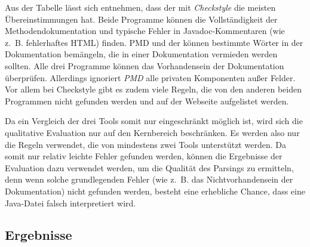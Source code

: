 Aus der Tabelle lässt sich entnehmen, dass der \doceval mit \textit{Checkstyle} die meisten Übereinstimmungen hat. Beide Programme können die Vollständigkeit der Methodendokumentation und typische Fehler in Javadoc-Kommentaren (wie z.~B. fehlerhaftes HTML) finden. PMD und der \doceval können bestimmte Wörter in der Dokumentation bemängeln, die in einer Dokumentation vermieden werden sollten. Alle drei Programme können das Vorhandensein der Dokumentation überprüfen. Allerdings ignoriert \textit{PMD} alle privaten Komponenten außer Felder. Vor allem bei Checkstyle gibt es zudem viele Regeln, die von den anderen beiden Programmen nicht gefunden werden und auf der Webseite \cite{checkstyle_doc_metrics} aufgelistet werden.

Da ein Vergleich der drei Tools somit nur eingeschränkt möglich ist, wird sich die qualitative Evaluation nur auf den Kernbereich beschränken. Es werden also nur die Regeln verwendet, die von mindestens zwei Tools unterstützt werden. Da somit nur relativ leichte Fehler gefunden werden, können die Ergebnisse der Evaluation dazu verwendet werden, um die Qualität des Parsings zu ermitteln, denn wenn solche grundlegenden Fehler (wie z.~B. das Nichtvorhandensein der Dokumentation) nicht gefunden werden, besteht eine erhebliche Chance, dass eine Java-Datei falsch interpretiert wird. 



\subsection{Ergebnisse}


